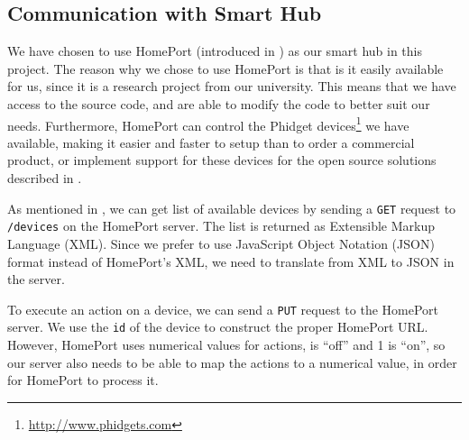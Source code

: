 \subsection{Communication with Smart Hub}\label{sec:designsmarthub}
We have chosen to use HomePort (introduced in ) as our smart hub in this project.
The reason why we chose to use HomePort is that is it easily available for us, 
since it is a research project from our university. 
This means that we have access to the source code, 
and are able to modify the code to better suit our needs.
Furthermore, HomePort can control the Phidget devices\footnote{\url{http://www.phidgets.com}} we have available, 
making it easier and faster to setup than to order a commercial product, 
or implement support for these devices for the open source solutions described in . 

As mentioned in , we can get list of available devices by sending a \texttt{GET} request to \texttt{/devices} on the HomePort server. 
The list is returned as Extensible Markup Language (XML). 
Since we prefer to use JavaScript Object Notation (JSON) format instead of HomePort's XML, 
we need to translate from XML to JSON in the server. 

To execute an action on a device, we can send a \texttt{PUT} request to the HomePort server. 
We use the \texttt{id} of the device to construct the proper HomePort URL. 
However, HomePort uses numerical values for actions,  is ``off'' and 1 is ``on'', 
so our server also needs to be able to map the actions to a numerical value, 
in order for HomePort to process it. 

